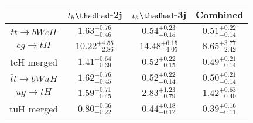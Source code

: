 \centering
\begin{tabular}{|c|c|c|c|} \hline
 & $t_h\thadhad$-2j & $t_h\thadhad$-3j & Combined\\\hline

$\bar{t}t\to bWcH$ & $1.63^{+0.76}_{-0.46}$ & $0.54^{+0.23}_{-0.15}$ & $0.51^{+0.22}_{-0.14}$\\\hline
$cg\to tH$ & $10.22^{+4.55}_{-2.86}$ & $14.48^{+6.15}_{-4.05}$ & $8.65^{+3.77}_{-2.42}$\\\hline
tcH merged & $1.41^{+0.64}_{-0.39}$ & $0.52^{+0.22}_{-0.15}$ & $0.49^{+0.21}_{-0.14}$\\\hline
$\bar{t}t\to bWuH$ & $1.62^{+0.76}_{-0.45}$ & $0.52^{+0.22}_{-0.14}$ & $0.50^{+0.21}_{-0.14}$\\\hline
$ug\to tH$ & $1.59^{+0.71}_{-0.45}$ & $2.83^{+1.23}_{-0.79}$ & $1.42^{+0.63}_{-0.40}$\\\hline
tuH merged & $0.80^{+0.36}_{-0.22}$ & $0.44^{+0.18}_{-0.12}$ & $0.39^{+0.16}_{-0.11}$\\\hline
\end{tabular}